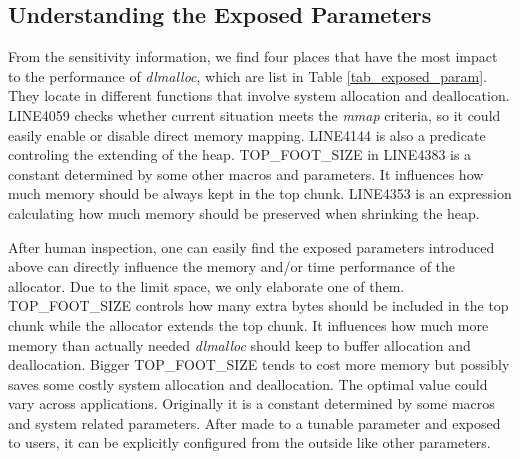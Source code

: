 \subsection{Understanding the Exposed Parameters}

\begin{table*}[htbp]
\centering
\caption{Exposed Parameters}
\label{tab_exposed_param}
\end{table*}
From the sensitivity information, we find four places that have the most impact to the performance of \emph{dlmalloc}, which are list in Table \ref{tab_exposed_param}. They locate in different functions that involve system allocation and deallocation. LINE4059 checks whether current situation meets the \emph{mmap} criteria, so it could easily enable or disable direct memory mapping. LINE4144 is also a predicate controling the extending of the heap. TOP\_FOOT\_SIZE in LINE4383 is a constant determined by some other macros and parameters. It influences how much memory should be always kept in the top chunk. LINE4353 is an expression calculating how much memory should be preserved when shrinking the heap.

After human inspection, one can easily find the exposed parameters introduced above can directly influence the memory and/or time performance of the allocator. Due to the limit space, we only elaborate one of them. TOP\_FOOT\_SIZE controls how many extra bytes should be included in the top chunk while the allocator extends the top chunk. It influences how much more memory than actually needed \emph{dlmalloc} should keep to buffer allocation and deallocation. Bigger TOP\_FOOT\_SIZE tends to cost more memory but possibly saves some costly system allocation and deallocation. The optimal value could vary across applications. Originally it is a constant determined by some macros and system related parameters. After made to a tunable parameter and exposed to users, it can be explicitly configured from the outside like other parameters.
